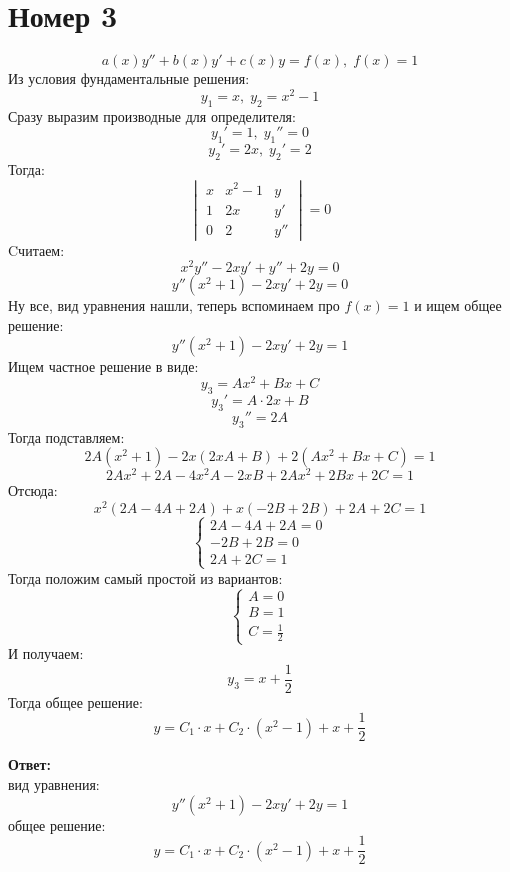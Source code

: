 \documentclass[a4paper,12pt]{article}
\begin{document}
\section*{Номер 3}
\[
a(x) y'' + b(x)y' + c(x) y = f(x), \; f(x) = 1
\]
Из условия фундаментальные решения:
\[
y_1 = x, \; y_2 = x^2 - 1
\]
Сразу выразим производные для определителя:
\[
y_1' = 1, \; y_1'' = 0 
\]
\[
y_2' = 2x, \; y_2' = 2
\]
Тогда:
\[
\begin{vmatrix}
x & x^2 - 1 & y \\
1 & 2x & y' \\
0 & 2 & y''
\end{vmatrix} = 0
\]
Cчитаем:
\[
x^2 y'' - 2xy' + y'' + 2y = 0
\]
\[
y''(x^2 + 1) - 2xy' + 2y = 0
\]
Ну все, вид уравнения нашли, теперь вспоминаем про $f(x) = 1$ и ищем общее решение:
\[
y''(x^2 + 1) - 2xy' + 2y = 1 
\]
Ищем частное решение в виде:
\[
y_3 = Ax^2 + Bx + C 
\]
\[
y_3' = A \cdot 2x + B 
\]
\[
y_3'' = 2A
\]
Тогда подставляем:
\[
2A(x^2 + 1) - 2x(2x A + B) + 2(Ax^2 + Bx + C) = 1
\]
\[
2Ax^2 + 2A - 4x^2A - 2xB + 2Ax^2 + 2Bx + 2C = 1
\]
Отсюда:
\[
x^2(2A - 4A + 2A) + x(-2B + 2B) + 2A + 2C = 1
\]
\[
\begin{cases}
2A - 4A + 2A = 0 \\
-2B + 2B = 0 \\
2A + 2C = 1
\end{cases}
\]
Тогда положим самый простой из вариантов:
\[
\begin{cases}
A = 0 \\
B = 1 \\
C = \frac{1}{2}
\end{cases}
\]
И получаем:
\[
y_3 =  x + \frac{1}{2}
\]
Тогда общее решение:
\[
y = C_1 \cdot x + C_2 \cdot (x^2 - 1) + x + \frac{1}{2}
\]
\begin{center}
\textbf{Ответ: } 
\\
вид уравнения:
\[
y''(x^2 + 1) - 2xy' + 2y = 1 
\]
общее решение:
\[
y = C_1 \cdot x + C_2 \cdot (x^2 - 1) + x + \frac{1}{2}
\]
\end{center}
\clearpage
\end{document}
